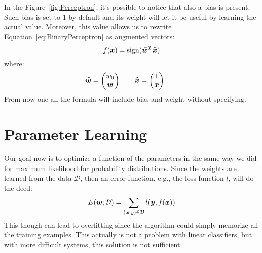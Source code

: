 In the Figure~\ref{fig:Perceptron}, it's possible to notice that also a bias is present. Such bias is set to 1 by default and its weight will let it be useful by learning the actual value. Moreover, this value allows us to rewrite Equation~\ref{eq:BinaryPerceptron} as augmented vectors:
\begin{equation*}
  f(\bm{x})=\text{sign}(\bm{\widehat{\bm{w}}}^T\widehat{\bm{x}})
\end{equation*}
where:
\[
  \widehat{\bm{w}}=\begin{pmatrix}w_0\\\bm{w}\end{pmatrix}\qquad
  \widehat{\bm{x}}=\begin{pmatrix}1\\\bm{x}\end{pmatrix}\qquad
\]
From now one all the formula will include bias and weight without specifying.\newline
%
%
%
\section{Parameter Learning}
Our goal now is to optimize a function of the parameters in the same way we did for maximum likelihood for probability distributions. \newline
Since the weights are learned from the data $\mathcal{D}$, then an error function, e.g., the loss function $l$, will do the deed:
\[E(\bm{w};\mathcal{D})=\displaystyle\sum_{(\bm{x},y)\in\mathcal{D}}l(\bm{y},f(\bm{x}))\]
This though can lead to overfitting since the algorithm could simply memorize all the training examples. This actually is not a problem with linear classifiers, but with more difficult systems, this solution is not sufficient. 
%
%
